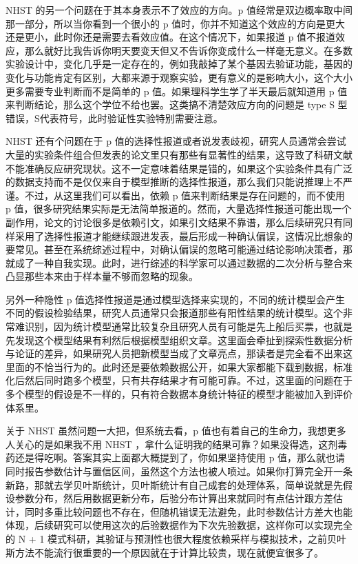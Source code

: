 \documentclass[]{tufte-book}
\begin{document}
NHST 的另一个问题在于其本身表示不了效应的方向。p 值经常是双边概率取中间那一部分，所以当你看到一个很小的 p 值时，你并不知道这个效应的方向是更大还是更小，此时你还是需要去看效应值。在这个情况下，如果报道 p 值不报道效应，那么就好比我告诉你明天要变天但又不告诉你变成什么一样毫无意义。在多数实验设计中，变化几乎是一定存在的，例如我敲掉了某个基因去验证功能，基因的变化与功能肯定有区别，大都来源于观察实验，更有意义的是影响大小，这个大小更多需要专业判断而不是简单的 p 值。如果理科学生学了半天最后就知道用 p 值来判断结论，那么这个学位不给也罢。这类搞不清楚效应方向的问题是 type S 型错误，S代表符号，此时验证性实验特别需要注意。

NHST 还有个问题在于 p 值的选择性报道或者说发表歧视，研究人员通常会尝试大量的实验条件组合但发表的论文里只有那些有显著性的结果，这导致了科研文献不能准确反应研究现状。这不一定意味着结果是错的，如果这个实验条件具有广泛的数据支持而不是仅仅来自于模型推断的选择性报道，那么我们只能说推理上不严谨。不过，从这里我们可以看出，依赖 p 值来判断结果是存在问题的，而不使用 p 值，很多研究结果实际是无法简单报道的。然而，大量选择性报道可能出现一个副作用，论文的讨论很多是依赖引文，如果引文结果不靠谱，那么后续研究只有同样采用了选择性报道才能继续跟进发表，最后形成一种确认偏误，这情况比想象的要常见。甚至在系统综述过程中，对确认偏误的忽略可能通过结论影响决策者，那就成了一种自我实现。此时，进行综述的科学家可以通过数据的二次分析与整合来凸显那些本来由于样本量不够而忽略的现象。

另外一种隐性 p 值选择性报道是通过模型选择来实现的，不同的统计模型会产生不同的假设检验结果，研究人员通常只会报道那些有阳性结果的统计模型。这个非常难识别，因为统计模型通常比较复杂且研究人员有可能是先上船后买票，也就是先发现这个模型结果有利然后根据模型组织文章。这里面会牵扯到探索性数据分析与论证的差异，如果研究人员把新模型当成了文章亮点，那读者是完全看不出来这里面的不恰当行为的。此时还是要依赖数据公开，如果大家都能下载到数据，标准化后然后同时跑多个模型，只有共存结果才有可能可靠。不过，这里面的问题在于多个模型的假设是不一样的，只有符合数据本身统计特征的模型才能被加入到评价体系里。

关于 NHST 虽然问题一大把，但系统去看，p 值也有着自己的生命力，我想更多人关心的是如果我不用 NHST ，拿什么证明我的结果可靠？如果没得选，这剂毒药还是得吃啊。答案其实上面都大概提到了，你如果坚持使用 p 值，那么就也请同时报告参数估计与置信区间，虽然这个方法也被人喷过。如果你打算完全开一条新路，那就去学贝叶斯统计，贝叶斯统计有自己成套的处理体系，简单说就是先假设参数分布，然后用数据更新分布，后验分布计算出来就同时有点估计跟方差估计，同时多重比较问题也不存在，但随机错误无法避免，此时参数估计方差大也能体现，后续研究可以使用这次的后验数据作为下次先验数据，这样你可以实现完全的 N + 1 模式科研，其验证与预测性也很大程度依赖采样与模拟技术，之前贝叶斯方法不能流行很重要的一个原因就在于计算比较贵，现在就便宜很多了。
\end{document}
